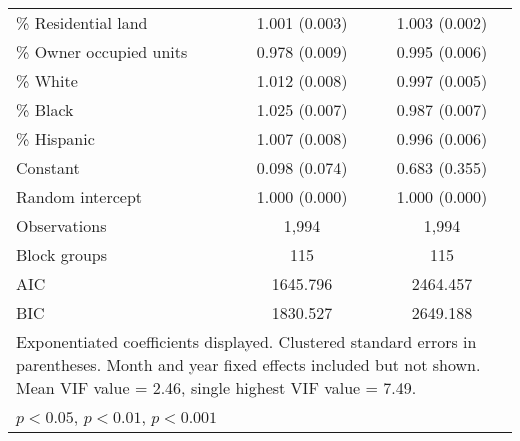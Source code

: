 \begin{table}[htbp]
\begin{adjustbox}{max width=\linewidth}
\begin{tabular}{l*{2}{c}}
\% Residential land&1.001 (0.003)        &1.003 (0.002)        \\
\% Owner occupied units&0.978\sym{*} (0.009)        &0.995 (0.006)        \\
\% White        &1.012 (0.008)        &0.997 (0.005)        \\
\% Black        &1.025\sym{**} (0.007)        &0.987 (0.007)        \\
\% Hispanic     &1.007 (0.008)        &0.996 (0.006)        \\
Constant        &0.098\sym{**} (0.074)        &0.683 (0.355)        \\
\midrule
Random intercept&1.000\sym{**} (0.000)        &1.000 (0.000)        \\
\midrule
Observations    &     1,994        &     1,994        \\
Block groups    &  115        &  115        \\
AIC             & 1645.796        & 2464.457        \\
BIC             & 1830.527        & 2649.188        \\
\bottomrule
\multicolumn{3}{p{16cm}}{\footnotesize Exponentiated coefficients displayed. Clustered standard errors in parentheses. Month and year fixed effects included but not shown. Mean VIF value = 2.46, single highest VIF value = 7.49.}\\
\multicolumn{3}{l}{\footnotesize \sym{*} \(p<0.05\), \sym{**} \(p<0.01\), \sym{**} \(p<0.001\)}\\
\end{tabular} \end{adjustbox}
\end{table}
